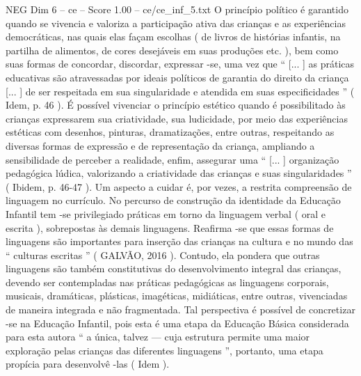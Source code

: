 \begin{textsample}{NEG Dim 6 – ce – Score 1.00 – ce/ce\_inf\_5.txt}
O princípio político é garantido quando se vivencia e valoriza a participação ativa das crianças e as experiências democráticas, nas quais elas façam escolhas ( de livros de histórias infantis, na partilha de alimentos, de cores desejáveis em suas produções etc. ), bem como suas formas de concordar, discordar, expressar -se, uma vez que “ [... ] as práticas educativas são atravessadas por ideais políticos de garantia do direito da criança [... ] de ser respeitada em sua singularidade e atendida em suas especificidades ” ( Idem, p. 46 ).
É possível vivenciar o princípio estético quando é possibilitado às crianças expressarem sua criatividade, sua ludicidade, por meio das experiências estéticas com desenhos, pinturas, dramatizações, entre outras, respeitando as diversas formas de expressão e de representação da criança, ampliando a sensibilidade de perceber a realidade, enfim, assegurar uma “ [... ] organização pedagógica lúdica, valorizando a criatividade das crianças e suas singularidades ” ( Ibidem, p. 46-47 ).
Um aspecto a cuidar é, por vezes, a restrita compreensão de linguagem no currículo.
No percurso de construção da identidade da Educação Infantil tem -se privilegiado práticas em torno da linguagem verbal ( oral e escrita ), sobrepostas às demais linguagens.
Reafirma -se que essas formas de linguagens são importantes para inserção das crianças na cultura e no mundo das “ culturas escritas ” ( GALVÃO, 2016 ).
Contudo, ela pondera que outras linguagens são também constitutivas do desenvolvimento integral das crianças, devendo ser contempladas nas práticas pedagógicas as linguagens corporais, musicais, dramáticas, plásticas, imagéticas, midiáticas, entre outras, vivenciadas de maneira integrada e não fragmentada.
Tal perspectiva é possível de concretizar -se na Educação Infantil, pois esta é uma etapa da Educação Básica considerada para esta autora “ a única, talvez — cuja estrutura permite uma maior exploração pelas crianças das diferentes linguagens ”, portanto, uma etapa propícia para desenvolvê -las ( Idem ).

\end{textsample}
